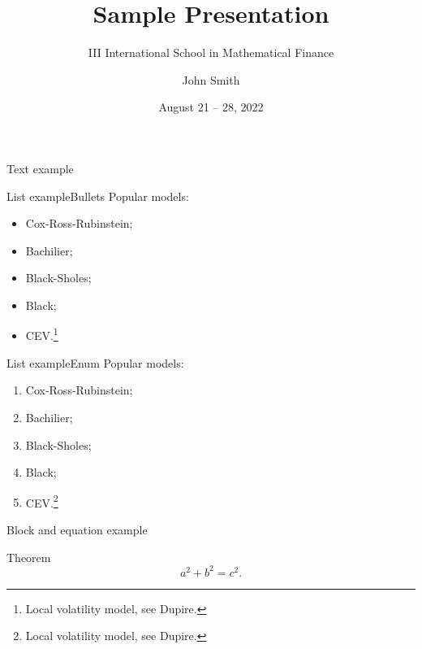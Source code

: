\documentclass{vegapresentation}
\title{Sample Presentation}
\subtitle{III International School in Mathematical Finance}
\author{John Smith}
\institute{Vega Institute Foundation}
\date{August 21 -- 28, 2022}
\begin{document}
    \maketitle

    \begin{frame}{Text example}
        \lipsum[1]
    \end{frame}

    \begin{frame}{List example}{Bullets}
        Popular models:
        \begin{itemize}
            \item Cox-Ross-Rubinstein;
            \item Bachilier;
            \item Black-Sholes;
            \item Black;
            \item CEV.\footnote{Local volatility model, see Dupire.}
        \end{itemize}
    \end{frame}

    \begin{frame}{List example}{Enum}
        Popular models:
        \begin{enumerate}
            \item Cox-Ross-Rubinstein;
            \item Bachilier;
            \item Black-Sholes;
            \item Black;
            \item CEV.\footnote{Local volatility model, see Dupire.}
        \end{enumerate}
    \end{frame}

    \begin{frame}{Block  and equation example}
        \begin{block}{Theorem}
            \begin{equation}
                a^2 + b^2 = c^2.
            \end{equation}
        \end{block}
    \end{frame}
\end{document}

